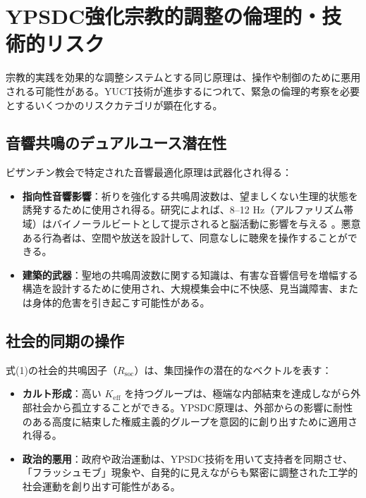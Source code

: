 \documentclass[12pt,a4paper]{article}
\begin{document}
	\section{YPSDC強化宗教的調整の倫理的・技術的リスク}
	\label{sec:risks}
	
	宗教的実践を効果的な調整システムとする同じ原理は、操作や制御のために悪用される可能性がある。YUCT技術が進歩するにつれて、緊急の倫理的考察を必要とするいくつかのリスクカテゴリが顕在化する。
	
	\subsection{音響共鳴のデュアルユース潜在性}
	
	ビザンチン教会で特定された音響最適化原理は武器化され得る：
	\begin{itemize}
		\item \textbf{指向性音響影響}：祈りを強化する共鳴周波数は、望ましくない生理的状態を誘発するために使用され得る。研究によれば、8–12 Hz（アルファリズム帯域）はバイノーラルビートとして提示されると脳活動に影響を与える \cite{Garcia2021}。悪意ある行為者は、空間や放送を設計して、同意なしに聴衆を操作することができる。
		
		\item \textbf{建築的武器}：聖地の共鳴周波数に関する知識は、有害な音響信号を増幅する構造を設計するために使用され、大規模集会中に不快感、見当識障害、または身体的危害を引き起こす可能性がある。
	\end{itemize}
	
	\subsection{社会的同期の操作}
	
	式(1)の社会的共鳴因子（$R_{\mathrm{soc}}$）は、集団操作の潜在的なベクトルを表す：
	\begin{itemize}
		\item \textbf{カルト形成}：高い $K_{\mathrm{eff}}$ を持つグループは、極端な内部結束を達成しながら外部社会から孤立することができる。YPSDC原理は、外部からの影響に耐性のある高度に結束した権威主義的グループを意図的に創り出すために適用され得る。
		
		\item \textbf{政治的悪用}：政府や政治運動は、YPSDC技術を用いて支持者を同期させ、「フラッシュモブ」現象や、自発的に見えながらも緊密に調整された工学的社会運動を創り出す可能性がある。
	\end{itemize}
	
\end{document}
